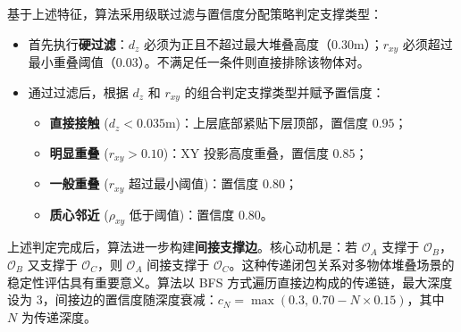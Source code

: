\documentclass[12pt,a4paper]{article}
\begin{document}
基于上述特征，算法采用级联过滤与置信度分配策略判定支撑类型：

\begin{itemize}
    \item 首先执行\textbf{硬过滤}：$d_z$ 必须为正且不超过最大堆叠高度（$0.30$m）；$r_{xy}$ 必须超过最小重叠阈值（$0.03$）。不满足任一条件则直接排除该物体对。
    \item 通过过滤后，根据 $d_z$ 和 $r_{xy}$ 的组合判定支撑类型并赋予置信度：
    \begin{itemize}
        \item \textbf{直接接触} ($d_z < 0.035$m)：上层底部紧贴下层顶部，置信度 $0.95$；
        \item \textbf{明显重叠} ($r_{xy} > 0.10$)：XY 投影高度重叠，置信度 $0.85$；
        \item \textbf{一般重叠} ($r_{xy}$ 超过最小阈值)：置信度 $0.80$；
        \item \textbf{质心邻近} ($\rho_{xy}$ 低于阈值)：置信度 $0.80$。
    \end{itemize}
\end{itemize}

上述判定完成后，算法进一步构建\textbf{间接支撑边}。核心动机是：若 $\mathcal{O}_A$ 支撑于 $\mathcal{O}_B$，$\mathcal{O}_B$ 又支撑于 $\mathcal{O}_C$，则 $\mathcal{O}_A$ 间接支撑于 $\mathcal{O}_C$。这种传递闭包关系对多物体堆叠场景的稳定性评估具有重要意义。算法以 BFS 方式遍历直接边构成的传递链，最大深度设为 $3$，间接边的置信度随深度衰减：$c_N = \max(0.3,\, 0.70 - N \times 0.15)$，其中 $N$ 为传递深度。
\end{document}
